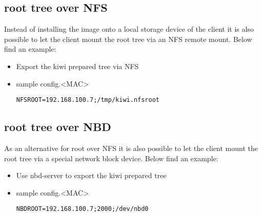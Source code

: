 \subsection{root tree over NFS}

Instead of installing the image onto a local storage device of
the client it is also possible to let the client mount the root
tree via an NFS remote mount. Below find an example:

\begin{itemize}
\item Export the kiwi prepared tree via NFS
\item sample config.<MAC>

\begin{Command}{12cm}
\begin{verbatim}
NFSROOT=192.168.100.7;/tmp/kiwi.nfsroot
\end{verbatim}
\end{Command}
\end{itemize}

\subsection{root tree over NBD}

As an alternative for root over NFS it is also possible to
let the client mount the root tree via a special network block
device. Below find an example:

\begin{itemize}
\item Use nbd-server to export the kiwi prepared tree
\item sample config.<MAC>

\begin{Command}{12cm}
\begin{verbatim}
NBDROOT=192.168.100.7;2000;/dev/nbd0
\end{verbatim}
\end{Command}
\end{itemize}
